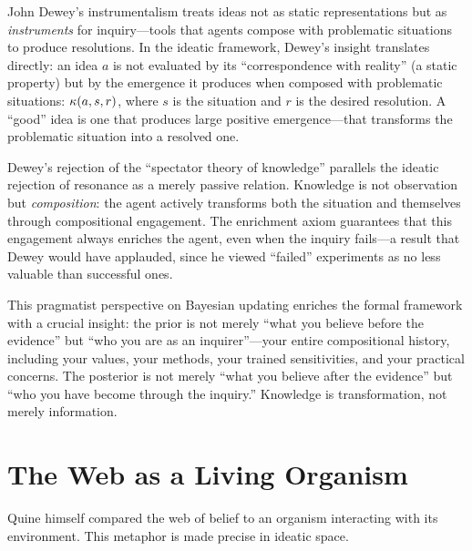 \begin{remark}
John Dewey's instrumentalism treats ideas not as static representations but as
\emph{instruments} for inquiry---tools that agents compose with problematic
situations to produce resolutions. In the ideatic framework, Dewey's insight
translates directly: an idea $a$ is not evaluated by its ``correspondence with
reality'' (a static property) but by the emergence it produces when composed with
problematic situations: $\kappa(a, s, r)$, where $s$ is the situation and $r$
is the desired resolution. A ``good'' idea is one that produces large positive
emergence---that transforms the problematic situation into a resolved one.

Dewey's rejection of the ``spectator theory of knowledge'' parallels the ideatic
rejection of resonance as a merely passive relation. Knowledge is not observation
but \emph{composition}: the agent actively transforms both the situation and
themselves through compositional engagement. The enrichment axiom guarantees that
this engagement always enriches the agent, even when the inquiry fails---a result
that Dewey would have applauded, since he viewed ``failed'' experiments as no
less valuable than successful ones.

This pragmatist perspective on Bayesian updating enriches the formal framework
with a crucial insight: the prior is not merely ``what you believe before the
evidence'' but ``who you are as an inquirer''---your entire compositional
history, including your values, your methods, your trained sensitivities, and
your practical concerns. The posterior is not merely ``what you believe after
the evidence'' but ``who you have become through the inquiry.'' Knowledge is
transformation, not merely information.
\end{remark}

\section{The Web as a Living Organism}

Quine himself compared the web of belief to an organism interacting with its
environment. This metaphor is made precise in ideatic space.

